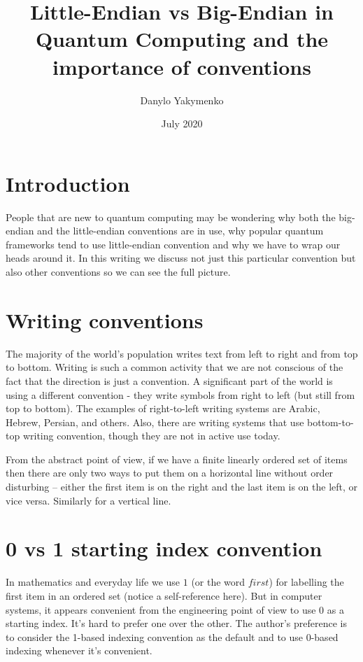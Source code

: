 \documentclass{article}
\title{Little-Endian vs Big-Endian in Quantum Computing and the importance of conventions}
\author{Danylo Yakymenko}
\date{July 2020}
\begin{document}
\maketitle

\section{Introduction}
People that are new to quantum computing may be wondering why both the big-endian and the little-endian conventions are in use, 
why popular quantum frameworks tend to use little-endian convention and why we have to wrap our heads around it.
In this writing we discuss not just this particular convention but also other conventions so we can see the full picture. 

\section{Writing conventions}

The majority of the world's population writes text from left to right and from top to bottom. 
Writing is such a common activity that we are not conscious of the fact that the direction is just a convention. 
A significant part of the world is using a different convention - they write symbols from right to left (but still from top to bottom). 
The examples of right-to-left writing systems are Arabic, Hebrew, Persian, and others.
Also, there are writing systems that use bottom-to-top writing convention, though they are not in active use today.

From the abstract point of view, if we have a finite linearly ordered set of items then there are only two ways to put them on a horizontal line without order disturbing – 
either the first item is on the right and the last item is on the left, or vice versa. Similarly for a vertical line.

\section{0 vs 1 starting index convention}
In mathematics and everyday life we use $1$ (or the word $\textit{first}$) for labelling the first item in an ordered set (notice a self-reference here). 
But in computer systems, it appears convenient from the engineering point of view to use $0$ as a starting index. 
It's hard to prefer one over the other. 
The author's preference is to consider the 1-based indexing convention as the default and to use 0-based indexing whenever it's convenient. 
\end{document}
